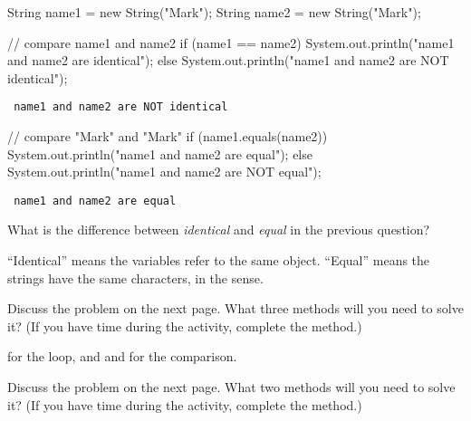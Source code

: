 \begin{javalst}
String name1 = new String("Mark");
String name2 = new String("Mark");
\end{javalst}

\begin{javalst}
// compare name1 and name2
if (name1 == name2) {
    System.out.println("name1 and name2 are identical");
} else {
    System.out.println("name1 and name2 are NOT identical");
}
\end{javalst}

\vspace{-2ex}
\begin{answer}[1em]
\tt \hspace{1em} name1 and name2 are NOT identical
\end{answer}

\begin{javalst}
// compare "Mark" and "Mark"
if (name1.equals(name2)) {
    System.out.println("name1 and name2 are equal");
} else {
    System.out.println("name1 and name2 are NOT equal");
}
\end{javalst}

\vspace{-2ex}
\begin{answer}[1em]
\tt \hspace{1em} name1 and name2 are equal
\end{answer}


\Q What is the difference between \emph{identical} and \emph{equal} in the previous question?

\begin{answer}
``Identical'' means the variables refer to the same  object.
``Equal'' means the strings have the same characters, in the  sense.
\end{answer}


\Q \label{stringMatch}
Discuss the  problem on the next page.
What three  methods will you need to solve it?
(If you have time during the activity, complete the method.)

\begin{answer}
 for the loop, and  and  for the comparison.
\end{answer}


\Q \label{stringYak}
Discuss the  problem on the next page.
What two  methods will you need to solve it?
(If you have time during the activity, complete the method.)

